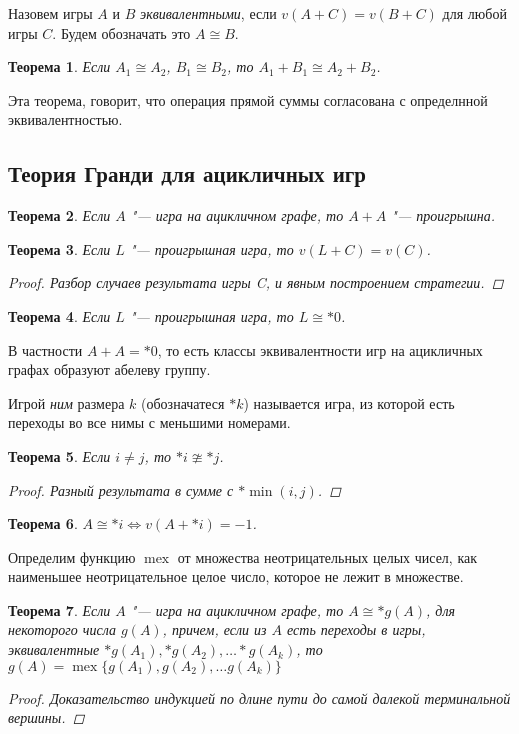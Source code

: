 \documentclass[12pt,a4paper]{article}
\theoremstyle{plain}
\newtheorem{thm}{Теорема}
\DeclareMathOperator{\mex}{mex}
\newcommand{\nim}[1]{*#1}
\begin{document}
Назовем игры $A$ и $B$ \emph{эквивалентными}, если $v(A+C) = v(B+C)$ для любой игры $C$.
Будем обозначать это $A \cong B$.

\begin{thm}
Если $A_1 \cong A_2$, $B_1 \cong B_2$, то $A_1 + B_1 \cong A_2 + B_2$.
\end{thm}

Эта теорема, говорит, что операция прямой суммы согласована с определнной эквивалентностью.

\subsection{Теория Гранди для ацикличных игр}

\begin{thm}
Если $A$ "--- игра на ацикличном графе, то $A + A$ "--- проигрышна.
\end{thm}

\begin{thm}
Если $L$ "--- проигрышная игра, то $v(L + C) = v(C)$.
\begin{proof}
Разбор случаев результата игры C, и явным построением стратегии.
\end{proof}
\end{thm}

\begin{thm}
Если $L$ "--- проигрышная игра, то $L \cong \nim{0}$.
\end{thm}

В частности $A + A = \nim{0}$, то есть классы эквивалентности игр на ацикличных графах образуют абелеву группу.

Игрой \emph{ним} размера $k$ (обозначатеся $\nim{k}$) называется игра, из которой есть переходы
во все нимы с меньшими номерами.

\begin{thm}
Если $i \neq j$, то $\nim{i} \ncong \nim{j}$.
\begin{proof}
Разный результата в сумме с $\nim{\min(i, j)}$.
\end{proof}
\end{thm}

\begin{thm}
$A \cong \nim{i} \Leftrightarrow v(A+\nim{i}) = -1$.
\end{thm}

Определим функцию $\mex$ от множества неотрицательных целых чисел,
как наименьшее неотрицательное целое число, которое не лежит в множестве.

\begin{thm}
Если $A$ "--- игра на ацикличном графе, то $A \cong \nim{g(A)}$, для некоторого числа $g(A)$,
причем, если из $A$ есть переходы в игры, эквивалентные $\nim{g(A_1)}, \nim{g(A_2)}, \dots \nim{g(A_k)}$,
то $g(A) = \mex\{g(A_1), g(A_2), \dots g(A_k)\}$
\begin{proof}
Доказательство индукцией по длине пути до самой далекой терминальной вершины.
\end{proof}
\end{thm}
\end{document}
